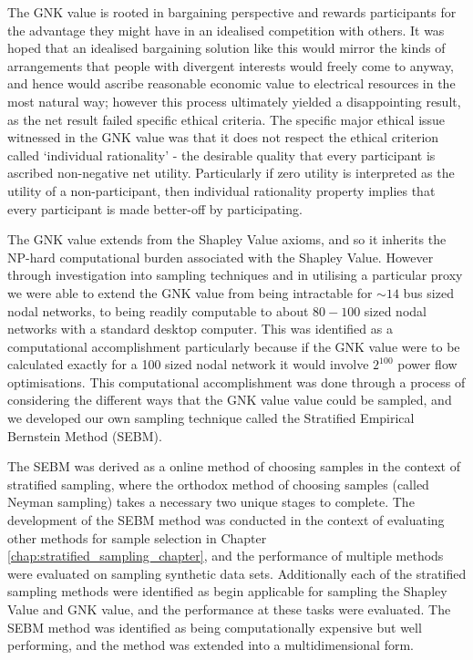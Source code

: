 The GNK value is rooted in bargaining perspective and rewards participants for the advantage they might have in an idealised competition with others.
It was hoped that an idealised bargaining solution like this would mirror the kinds of arrangements that people with divergent interests would freely come to anyway, and hence would ascribe reasonable economic value to electrical resources in the most natural way; however this process ultimately yielded a disappointing result, as the net result failed specific ethical criteria.
The specific major ethical issue witnessed in the GNK value was that it does not respect the ethical criterion called `individual rationality' - the desirable quality that every participant is ascribed non-negative net utility.
Particularly if zero utility is interpreted as the utility of a non-participant, then individual rationality property implies that every participant is made better-off by participating.

The GNK value extends from the Shapley Value axioms, and so it inherits the NP-hard computational burden associated with the Shapley Value.
However through investigation into sampling techniques and in utilising a particular proxy we were able to extend the GNK value from being intractable for $\sim 14$ bus sized nodal networks, to being readily computable to about $80-100$ sized nodal networks with a standard desktop computer.
This was identified as a computational accomplishment particularly because if the GNK value were to be calculated exactly for a 100 sized nodal network it would involve $2^{100}$ power flow optimisations.
This computational accomplishment was done through a process of considering the different ways that the GNK value value could be sampled, and we developed our own sampling technique called the Stratified Empirical Bernstein Method (SEBM).

The SEBM was derived as a online method of choosing samples in the context of stratified sampling, where the orthodox method of choosing samples (called Neyman sampling) takes a necessary two unique stages to complete.
The development of the SEBM method was conducted in the context of evaluating other methods for sample selection in Chapter \ref{chap:stratified_sampling_chapter}, and the performance of multiple methods were evaluated on sampling synthetic data sets.
Additionally each of the stratified sampling methods were identified as begin applicable for sampling the Shapley Value and GNK value, and the performance at these tasks were evaluated.
The SEBM method was identified as being computationally expensive but well performing, and the method was extended into a multidimensional form.

